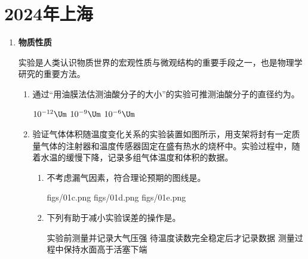 \documentclass[\gkver]{gaokaozhenti}
\begin{document}
\chapter{2024年上海}

\begin{enumerate}
\item
\textbf{物质性质}

实验是人类认识物质世界的宏观性质与微观结构的重要手段之一，也是物理学研究的重要方法。
\begin{enumerate}
	\item
	通过“用油膜法估测油酸分子的大小”的实验可推测油酸分子的直径约为。

	{$10^{-12} \Um$}
	{$10^{-9} \Um$}
	{$10^{-6} \Um$}

	\item
	验证气体体积随温度变化关系的实验装置如图所示，用支架将封有一定质量气体的注射器和温度传感器固定在盛有热水的烧杯中。实验过程中，随着水温的缓慢下降，记录多组气体温度和体积的数据。

	\onepicture[h=3.6cm, align=right]{}
	\begin{enumerate}
		\item
		不考虑漏气因素，符合理论预期的图线是。

		{figs/01c.png}
		{figs/01d.png}
		{figs/01e.png}

		\item
		下列有助于减小实验误差的操作是。

		{实验前测量并记录大气压强}
		{待温度读数完全稳定后才记录数据}
		{测量过程中保持水面高于活塞下端}
	\end{enumerate}
\end{enumerate}
\end{enumerate}
\end{document}

